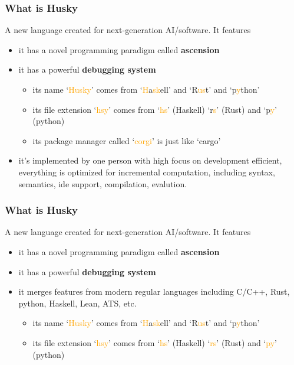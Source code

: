 \documentclass{beamer}   	%
\theoremstyle{definition}
\begin{document}
\begin{frame}
\frametitle{What is Husky}
A new language created for next-generation AI/software. It features
\begin{itemize}
	\item it has a novel programming paradigm called \textbf{ascension}
	\item it has a powerful \textbf{debugging system}
	\begin{itemize}
		\item its name `\textcolor{orange}{Husky}' comes from `\textcolor{orange}{H}a\textcolor{orange}{sk}ell' and `R\textcolor{orange}{us}t' and `p\textcolor{orange}{y}thon'
		\item its file extension `\textcolor{orange}{hsy}' comes from `\textcolor{orange}{hs}' (Haskell) `r\textcolor{orange}{s}' (Rust) and `p\textcolor{orange}{y}' (python)
		\item its package manager called `\textcolor{orange}{corgi}' is just like `cargo'
	\end{itemize}
	\item it's implemented by one person with high focus on development efficient, everything is optimized for incremental computation, including syntax, semantics, ide support, compilation, evalution.
\end{itemize}
\end{frame}

\begin{frame}
\frametitle{What is Husky}
A new language created for next-generation AI/software. It features
\begin{itemize}
	\item it has a novel programming paradigm called \textbf{ascension}
	\item it has a powerful \textbf{debugging system}
	\item it merges features from modern regular languages including C/C++, Rust, python, Haskell, Lean, ATS, etc.
	\begin{itemize}
		\item its name `\textcolor{orange}{Husky}' comes from `\textcolor{orange}{H}a\textcolor{orange}{sk}ell' and `R\textcolor{orange}{us}t' and `p\textcolor{orange}{y}thon'
		\item its file extension `\textcolor{orange}{hsy}' comes from `\textcolor{orange}{hs}' (Haskell) `\textcolor{orange}{rs}' (Rust) and `\textcolor{orange}{py}' (python)
	\end{itemize}
\end{itemize}
\end{frame}
\end{document}
